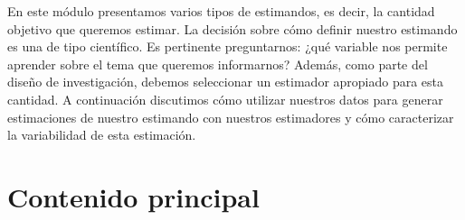 \documentclass[
  12pt,
  spanish,
]{book}
\begin{document}
En este módulo presentamos varios tipos de estimandos, es decir, la cantidad objetivo que queremos estimar. La decisión sobre cómo definir nuestro estimando es una de tipo científico. Es pertinente preguntarnos: ¿qué variable nos permite aprender sobre el tema que queremos informarnos? Además, como parte del diseño de investigación, debemos seleccionar un estimador apropiado para esta cantidad. A continuación discutimos cómo utilizar nuestros datos para generar estimaciones de nuestro estimando con nuestros estimadores y cómo caracterizar la variabilidad de esta estimación.

\hypertarget{contenido-principal-4}{%
\section{Contenido principal}\label{contenido-principal-4}}
\end{document}
